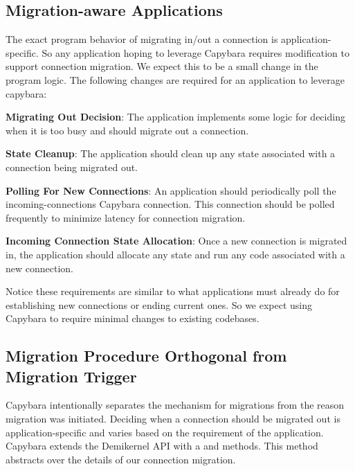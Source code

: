 \subsection{Migration-aware Applications}
The exact program behavior of migrating in/out a connection is application-specific. So any application hoping to leverage Capybara requires modification to support connection migration. We expect this to be a small change in the program logic. The following changes are required for an application to leverage capybara:
\begin{compactitem}
    \item \textbf{Migrating Out Decision}: The application implements some logic for deciding when it is too busy and should migrate out a connection.
    \item \textbf{State Cleanup}: The application should clean up any state associated with a connection being migrated out.
    \item \textbf{Polling For New Connections}: An application should periodically poll the incoming-connections Capybara connection. This connection should be polled frequently to minimize latency for connection migration.
    \item \textbf{Incoming Connection State Allocation}: Once a new connection is migrated in, the application should allocate any state and run any code associated with a new connection.
\end{compactitem}

Notice these requirements are similar to what applications must already do for establishing new connections or ending current ones. So we expect using Capybara to require minimal changes to existing codebases.

\subsection{Migration Procedure Orthogonal from Migration Trigger}
Capybara intentionally separates the mechanism for migrations from the reason migration was initiated. Deciding when a connection should be migrated out is application-specific and varies based on the requirement of the application. Capybara extends the Demikernel API with a  and  methods. This method abstracts over the details of our connection migration.

